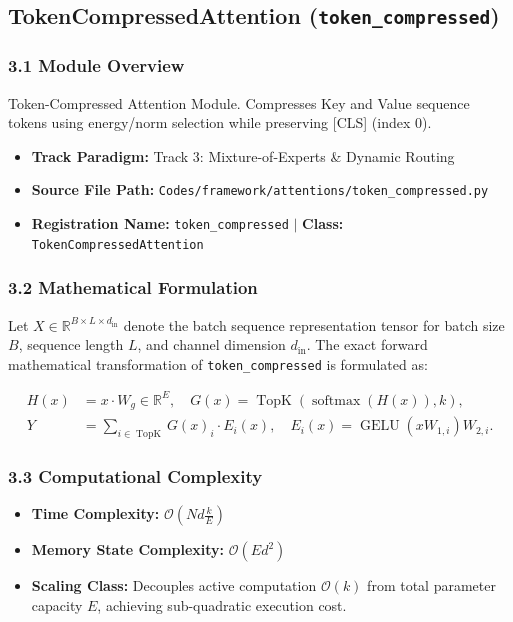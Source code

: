 \subsection{TokenCompressedAttention (\texttt{token\_compressed})}
\label{sec:app_module_token_compressed}

\subsubsection*{3.1 Module Overview}
Token-Compressed Attention Module. Compresses Key and Value sequence tokens using energy/norm selection while preserving [CLS] (index 0).
\begin{itemize}
    \item \textbf{Track Paradigm:} Track 3: Mixture-of-Experts & Dynamic Routing
    \item \textbf{Source File Path:} \texttt{Codes/framework/attentions/token\_compressed.py}
    \item \textbf{Registration Name:} \texttt{token\_compressed} $\mid$ \textbf{Class:} \texttt{TokenCompressedAttention}
\end{itemize}

\subsubsection*{3.2 Mathematical Formulation}
Let $X \in \mathbb{R}^{B \times L \times d_{\text{in}}}$ denote the batch sequence representation tensor for batch size $B$, sequence length $L$, and channel dimension $d_{\text{in}}$. The exact forward mathematical transformation of \texttt{token\_compressed} is formulated as:

\begin{align}
H(x) &= x \cdot W_g \in \mathbb{R}^{E}, \quad G(x) = \operatorname{TopK}\left(\operatorname{softmax}(H(x)), k\right), \\
Y &= \sum_{i \in \operatorname{TopK}} G(x)_i \cdot E_i(x), \quad E_i(x) = \operatorname{GELU}(x W_{1, i}) W_{2, i}.
\end{align}


\subsubsection*{3.3 Computational Complexity}
\begin{itemize}
    \item \textbf{Time Complexity:} $\mathcal{O}(N d \frac{k}{E})$
    \item \textbf{Memory State Complexity:} $\mathcal{O}(E d^2)$
    \item \textbf{Scaling Class:} Decouples active computation $\mathcal{O}(k)$ from total parameter capacity $E$, achieving sub-quadratic execution cost.
\end{itemize}

